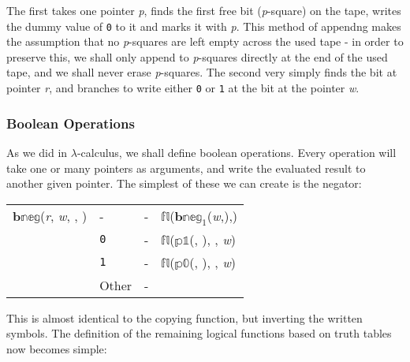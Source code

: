 \documentclass[Master.tex]{subfiles}
\begin{document}
\medskip

The first takes one pointer \textit{p}, finds the first free bit (\textit{p}-square) on the tape, writes the dummy value of \texttt{0} to it and marks it with \textit{p}. This method of appendng makes the assumption that no \textit{p}-squares are left empty across the used tape - in order to preserve this, we shall only append to \textit{p}-squares directly at the end of the used tape, and we shall never erase \textit{p}-squares. The second very simply finds the bit at pointer \textit{r}, and branches to write either \texttt{0} or \texttt{1} at the bit at the pointer \textit{w}.

\subsubsection{Boolean Operations}

As we did in $\lambda$-calculus, we shall define boolean operations. Every operation will take one or many pointers as arguments, and write the evaluated result to another given pointer. The simplest of these we can create is the negator:

\medskip\noindent\begin{tabu} to \textwidth{XXXX}
    $\mathbb{\mathbf{b}neg}$(\textit{r}, \textit{w}, , )   & - & - & $\mathbb{fl}$($\mathbb{\mathbf{b}neg}_1$(\textit{w},),) \\
    \hhline{----}
     & \texttt{0} & - & $\mathbb{fl}$($\mathbb{p1}$(, ), , \textit{w}) \\
                                                                                       & \texttt{1} & - & $\mathbb{fl}$($\mathbb{p0}$(, ), , \textit{w}) \\ 
                                                                                       & Other & - &  \\
\end{tabu}

\medskip
This is almost identical to the copying function, but inverting the written symbols. The definition of the remaining logical functions based on truth tables now becomes simple:
\end{document}
